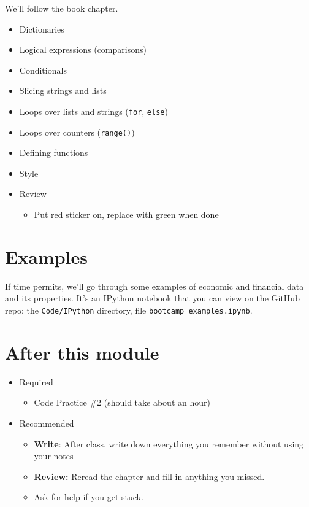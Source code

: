 We'll follow the book chapter.
\begin{itemize}
\item Dictionaries
\item Logical expressions (comparisons)
\item Conditionals
\item Slicing strings and lists
\item Loops over lists and strings ({\tt for}, {\tt else})
\item Loops over counters ({\tt range()})
\item Defining functions
\item Style
\item Review
\begin{itemize}
\item Put red sticker on, replace with green when done
\end{itemize}
\end{itemize}

\section*{Examples}

If time permits, we'll go through some examples of economic and financial data
and its properties.  It's an IPython notebook that you can view on the GitHub repo:
the \verb|Code/IPython| directory,
file \verb|bootcamp_examples.ipynb|.


\section*{After this module}

\begin{itemize}
\item Required
\begin{itemize}
\item Code Practice \#2 (should take about an hour)
\end{itemize}
\item Recommended
\begin{itemize}
\item {\bf Write}:  After class, write down everything you remember without using your notes
\item {\bf Review:} Reread the chapter and fill in anything you missed.
\item Ask for help if you get stuck.
\end{itemize}
\end{itemize}

%



